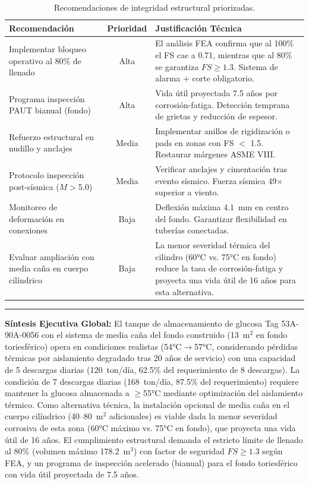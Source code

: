 \begin{table}[H]
\centering
\caption{Recomendaciones de integridad estructural priorizadas.}
\label{tab:resumen_recomendaciones_estructurales}
\setcounter{itemcount}{0}
\begin{tabularx}{\textwidth}{@{}lcX@{}}
\toprule
\textbf{Recomendación} & \textbf{Prioridad} & \textbf{Justificación Técnica} \\
\midrule
Implementar bloqueo operativo al 80\% de llenado & Alta & El análisis FEA confirma que al 100\% el FS cae a 0.71, mientras que al 80\% se garantiza $FS \geq 1.3$. Sistema de alarma + corte obligatorio. \\
\midrule
Programa inspección PAUT bianual (fondo) & Alta & Vida útil proyectada 7.5 años por corrosión-fatiga. Detección temprana de grietas y reducción de espesor. \\
\midrule
Refuerzo estructural en nudillo y anclajes & Media & Implementar anillos de rigidización o pads en zonas con FS $<$ 1.5. Restaurar márgenes ASME VIII. \\
\midrule
Protocolo inspección post-sísmica ($M>$5.0) & Media & Verificar anclajes y cimentación tras evento sísmico. Fuerza sísmica 49$\times$ superior a viento. \\
\midrule
Monitoreo de deformación en conexiones & Baja & Deflexión máxima 4.1~mm en centro del fondo. Garantizar flexibilidad en tuberías conectadas. \\
\midrule
Evaluar ampliación con media caña en cuerpo cilíndrico & Baja & La menor severidad térmica del cilindro (60°C vs. 75°C en fondo) reduce la tasa de corrosión-fatiga y proyecta una vida útil de 16 años para esta alternativa. \\
\bottomrule
\end{tabularx}
\end{table}

\vspace{1em}
\noindent\rule{\textwidth}{0.5pt}

\textbf{Síntesis Ejecutiva Global:} El tanque de almacenamiento de glucosa Tag 53A-90A-0056 con el sistema de media caña del fondo construido (13~m$^2$ en fondo toriesférico) opera en condiciones realistas (54°C$\rightarrow$57°C, considerando pérdidas térmicas por aislamiento degradado tras 20 años de servicio) con una capacidad de 5 descargas diarias (120~ton/día, 62.5\% del requerimiento de 8 descargas). La condición de 7 descargas diarias (168~ton/día, 87.5\% del requerimiento) requiere mantener la glucosa almacenada a $\geq$55°C mediante optimización del aislamiento térmico. Como alternativa técnica, la instalación opcional de media caña en el cuerpo cilíndrico (40--80~m$^2$ adicionales) es viable dada la menor severidad corrosiva de esta zona (60°C máximo vs. 75°C en fondo), que proyecta una vida útil de 16 años. El cumplimiento estructural demanda el estricto límite de llenado al 80\% (volumen máximo 178.2~m$^3$) con factor de seguridad $FS \geq 1.3$ según FEA, y un programa de inspección acelerado (bianual) para el fondo toriesférico con vida útil proyectada de 7.5 años.

\newpage
